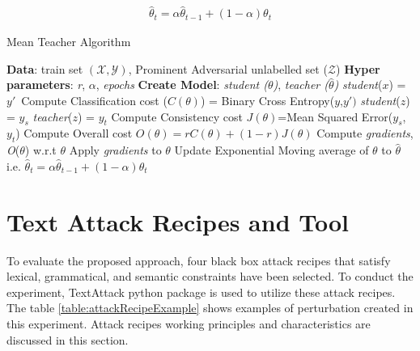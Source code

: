 \documentclass[%
	BCOR=8mm, %
	DIV=12,
	toc=bibliography, %
	toc=listof, %
	oneside, %
	egregdoesnotlikesansseriftitles, %
	]{scrbook}
\begin{document}
 \begin{equation}
     \begin{aligned}
         \hat\theta_t= \alpha\hat\theta_{t-1}+(1-\alpha)\theta_t
         \label{eq:ema}
         \end{aligned}
  \end{equation}

\begin{algorithm}[H]
    \caption{Mean Teacher Algorithm} \label{alg:MeanTeacher}
    \begin{algorithmic}
        \STATE \textbf{Data}: train set $\mathcal{(X,Y)}$,  Prominent Adversarial unlabelled set ($\mathcal{Z}$)
        \STATE \textbf{Hyper parameters}: \emph{r}, \emph{$\alpha$}, \emph{epochs}
        \STATE \textbf{Create Model}: \emph{student ($\theta$)}, \emph{teacher ($\hat\theta$)} 
        \STATE  \emph{student}($x$) = $y'$\
        \STATE Compute Classification cost ($C(\theta)$) = Binary Cross Entropy($y$,$y')$
        \STATE  \emph{student}($z$) = $y_s$
        \STATE  \emph{teacher}($z$) = $y_t$
        \STATE Compute Consistency cost $J(\theta)$=Mean Squared Error($y_s$,$y_{t}$)
        \STATE Compute Overall cost  $\textit{O}(\theta)= r C(\theta)+(1-r)J(\theta)$
        \STATE Compute \emph{gradients}, \textit{O}($\theta$) w.r.t  $\theta$ 
        \STATE Apply \emph{gradients} to $\theta$
        \STATE Update Exponential Moving average of $\theta$ to $\hat\theta$ i.e. $\hat\theta_t= \alpha\hat\theta_{t-1}+(1-\alpha)\theta_t$\
        \ENDWHILE
        \ENDFOR
    \end{algorithmic}
\end{algorithm}

\section{Text Attack Recipes and Tool}
\label{section:attackrecipes}
To evaluate the proposed approach, four black box attack recipes that satisfy lexical, grammatical, and semantic constraints have been selected. To conduct the experiment, TextAttack python package \cite{morris_textattack_2020} is used to utilize these attack recipes. The table \ref{table:attackRecipeExample} shows  examples of perturbation created in this experiment. Attack recipes  working principles and characteristics are discussed in this section. 
\end{document}
